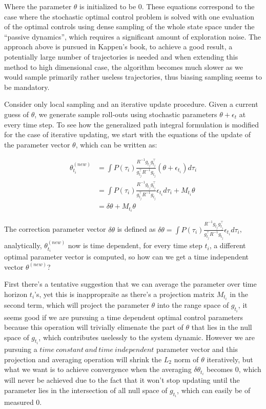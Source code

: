 \documentclass[journal]{IEEEtran}
\begin{document}
Where the parameter $\theta$ is initialized to be 0. These equations correspond to the case where the stochastic optimal control problem is solved with one evaluation of the optimal controls
using dense sampling of the whole state space under the “passive dynamics”, which requires a significant amount of exploration noise.
The approach above is pursued in Kappen's book, to achieve a good result, a potentially large number of trajectories is needed and when extending this method to high dimensional case, 
the algorithm becomes much slower as we would sample primarily rather useless trajectories, thus biasing sampling seems to be mandatory.

Consider only local sampling and an iterative update procedure. Given a current guess of $\theta$, we generate sample roll-outs using stochastic parameters 
$\theta + \epsilon_t$ at every time step. To see how the
 generalized path integral formulation is modified for the case of iterative updating,
 we start with the equations of the update of the parameter vector $\theta$, which can be written as:

 \begin{equation}
  \begin{aligned}
  \theta_{t_i}^{(new)} &= \int P(\tau_i) \frac{R^{-1}g_{t_j}g_{t_j}^{\top}}{g_{t_j}^{\top}R^{-1}g_{t_j}} (\theta+\epsilon_{t_i}) d\tau_i \\
  & = \int P(\tau_i) \frac{R^{-1}g_{t_j}g_{t_j}^{\top}}{g_{t_j}^{\top}R^{-1}g_{t_j}} \epsilon_{t_i} d\tau_i + M_{t_i} \theta \\
  & = \delta \theta + M_{t_i} \theta
  \end{aligned}
 \end{equation}

 The correction parameter vector $\delta \theta$ is defined as $\delta \theta =\int P(\tau_i) \frac{R^{-1}g_{t_j}g_{t_j}^{\top}}{g_{t_j}^{\top}R^{-1}g_{t_j}} \epsilon_{t_i} d\tau_i$, analytically, $\theta_{t_i}^{(new)}$ now is time dependent,
 for every time step $t_i$, a different optimal parameter vector is computed, so how can we get a time independent vector $\theta^{(new)}$?
 
 First there's a tentative suggestion that we can average the parameter over time horizon $t_i$'s, yet this is inappropraite as there's a projection matrix $M_{t_i}$ in the second term,
 which will project the parameter $\theta$ into the range space of $g_{t_i}$, it seems good if we are pursuing a time dependent optimal control parameters because this operation will trivially elimenate
 the part of $\theta$ that lies in the null space of $g_{t_i}$, which contributes uselessly to the system dynamic. However we are pursuing a $time\ constant\ and\ time\ independent$ parameter vector and 
 this projection and averaging operation will shrink the $L_2$ norm of $\theta$ iteratively, but what we want is to achieve convergence when the averaging $\delta \theta_{t_i}$ becomes 0, which will never be
 achieved due to the fact that it won't stop updating until the parameter lies in the intersection of all null space of $g_{t_i}$, which can easily be of measured 0. 
\end{document}
